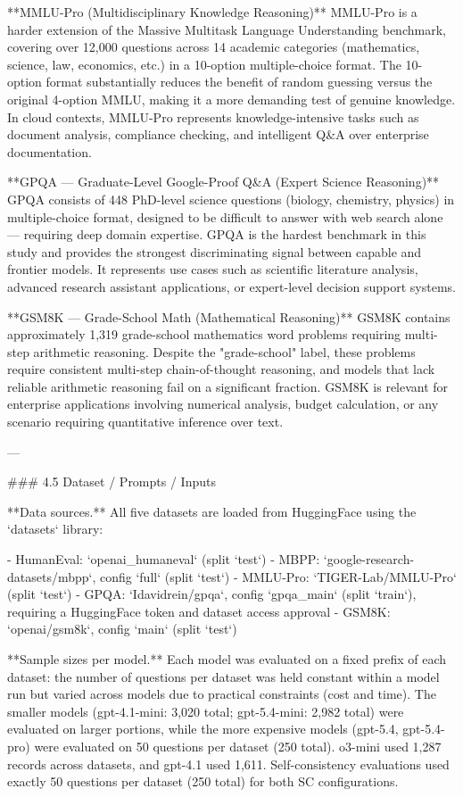 **MMLU-Pro (Multidisciplinary Knowledge Reasoning)**
MMLU-Pro is a harder extension of the Massive Multitask Language Understanding benchmark, covering over 12,000 questions across 14 academic categories (mathematics, science, law, economics, etc.) in a 10-option multiple-choice format. The 10-option format substantially reduces the benefit of random guessing versus the original 4-option MMLU, making it a more demanding test of genuine knowledge. In cloud contexts, MMLU-Pro represents knowledge-intensive tasks such as document analysis, compliance checking, and intelligent Q&A over enterprise documentation.

**GPQA — Graduate-Level Google-Proof Q&A (Expert Science Reasoning)**
GPQA consists of 448 PhD-level science questions (biology, chemistry, physics) in multiple-choice format, designed to be difficult to answer with web search alone — requiring deep domain expertise. GPQA is the hardest benchmark in this study and provides the strongest discriminating signal between capable and frontier models. It represents use cases such as scientific literature analysis, advanced research assistant applications, or expert-level decision support systems.

**GSM8K — Grade-School Math (Mathematical Reasoning)**
GSM8K contains approximately 1,319 grade-school mathematics word problems requiring multi-step arithmetic reasoning. Despite the "grade-school" label, these problems require consistent multi-step chain-of-thought reasoning, and models that lack reliable arithmetic reasoning fail on a significant fraction. GSM8K is relevant for enterprise applications involving numerical analysis, budget calculation, or any scenario requiring quantitative inference over text.

---

### 4.5 Dataset / Prompts / Inputs

**Data sources.** All five datasets are loaded from HuggingFace using the `datasets` library:

- HumanEval: `openai_humaneval` (split `test`)
- MBPP: `google-research-datasets/mbpp`, config `full` (split `test`)
- MMLU-Pro: `TIGER-Lab/MMLU-Pro` (split `test`)
- GPQA: `Idavidrein/gpqa`, config `gpqa_main` (split `train`), requiring a HuggingFace token and dataset access approval
- GSM8K: `openai/gsm8k`, config `main` (split `test`)

**Sample sizes per model.** Each model was evaluated on a fixed prefix of each dataset: the number of questions per dataset was held constant within a model run but varied across models due to practical constraints (cost and time). The smaller models (gpt-4.1-mini: 3,020 total; gpt-5.4-mini: 2,982 total) were evaluated on larger portions, while the more expensive models (gpt-5.4, gpt-5.4-pro) were evaluated on 50 questions per dataset (250 total). o3-mini used 1,287 records across datasets, and gpt-4.1 used 1,611. Self-consistency evaluations used exactly 50 questions per dataset (250 total) for both SC configurations.

